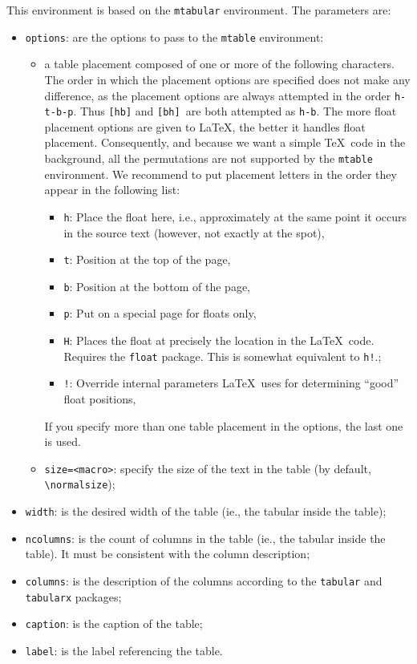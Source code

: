 \documentclass[book]{upmethodology-document}
\begin{document}
This environment is based on the \texttt{mtabular} environment. The parameters are:
\begin{itemize}
\item \texttt{options}: are the options to pass to the \texttt{mtable} environment: \begin{itemize}
		\item a table placement composed of one or more of the following characters. The order in which the placement options are specified does not make any difference, as the placement options are always attempted in the order \texttt{h-t-b-p}. Thus \texttt{[hb]} and \texttt{[bh] }are both attempted as \texttt{h-b}. The more float placement options are given to \LaTeX, the better it handles float placement. Consequently, and because we want a simple \TeX\ code in the background, all the permutations are not supported by the \texttt{mtable} environment. We recommend to put placement letters in the order they appear in the following list: \begin{itemize}
		
			\item \texttt{h}: Place the float here, i.e., approximately at the same point it occurs in the source text (however, not exactly at the spot),
			\item \texttt{t}: Position at the top of the page,
			\item \texttt{b}: Position at the bottom of the page,
			\item \texttt{p}: Put on a special page for floats only,
			\item \texttt{H}: Places the float at precisely the location in the \LaTeX\ code. Requires the \texttt{float} package. This is somewhat equivalent to \texttt{h!}.;
			\item \texttt{!}: Override internal parameters \LaTeX\ uses for determining ``good'' float positions,
		\end{itemize}
		If you specify more than one table placement in the options, the last one is used.
		\item \texttt{size=\string<macro\string>}: specify the size of the text in the table (by default, \texttt{{\textbackslash}normalsize});
	\end{itemize}
\item \texttt{width}: is the desired width of the table (ie., the tabular inside the table);
\item \texttt{ncolumns}: is the count of columns in the table (ie., the tabular inside the table). It must be consistent with the column description;
\item \texttt{columns}: is the description of the columns according to the \texttt{tabular} and \texttt{tabularx} packages;
\item \texttt{caption}: is the caption of the table;
\item \texttt{label}: is the label referencing the table.
\end{itemize}
\end{document}
